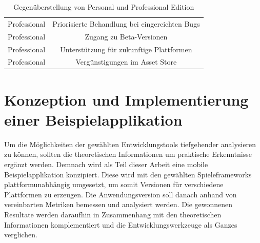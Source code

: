 \begin{table}[htbp]
{\begin{tabular}{cc}
			\rowcolor[HTML]{C0C0C0} 
			Professional                            & Priorisierte Behandlung bei eingereichten Bugs                                                                                        \\
			Professional                            & Zugang zu Beta-Versionen                                                                                                              \\
			\rowcolor[HTML]{C0C0C0} 
			Professional                            & Unterstützung für zukunftige Plattformen                                                                                              \\
			Professional                            & Vergünstigungen im Asset Store                                                                                                       
		\end{tabular}
	}
	\caption{Gegenüberstellung von Personal und Professional Edition}
	\label{Unity_Produkte}\citep{unity_products}
\end{table}


\chapter{Konzeption und Implementierung einer Beispielapplikation}
Um die Möglichkeiten der gewählten Entwicklungstools tiefgehender analysieren zu können, sollten die theoretischen Informationen um praktische Erkenntnisse ergänzt werden. Demnach wird als Teil dieser Arbeit eine mobile Beispielapplikation konzipiert. Diese wird mit den gewählten Spieleframeworks plattformunabhängig umgesetzt, um somit Versionen für verschiedene Plattformen zu erzeugen. Die Anwendungsversion soll danach anhand von vereinbarten Metriken bemessen und analysiert werden. Die gewonnenen Resultate werden daraufhin in Zusammenhang mit den theoretischen Informationen komplementiert und die Entwicklungswerkzeuge als Ganzes verglichen. 

